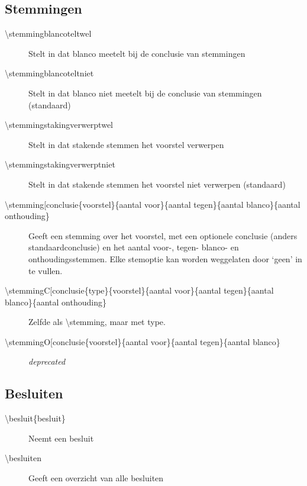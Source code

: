 \documentclass[a4paper]{notulen}
\begin{document}
		\subsection{Stemmingen}
		\begin{description}
			\item[\textbackslash stemmingblancoteltwel] Stelt in dat blanco meetelt bij de conclusie van stemmingen
			\item[\textbackslash stemmingblancoteltniet] Stelt in dat blanco niet meetelt bij de conclusie van stemmingen (standaard)
			\item[\textbackslash stemmingstakingverwerptwel] Stelt in dat stakende stemmen het voorstel verwerpen
			\item[\textbackslash stemmingstakingverwerptniet] Stelt in dat stakende stemmen het voorstel niet verwerpen (standaard)
			
			\item[\textbackslash stemming[conclusie\rbrack\{voorstel\}\{aantal voor\}\{aantal tegen\}\{aantal blanco\}\{aantal onthouding\}] Geeft een stemming over het voorstel, met een optionele conclusie (anders standaardconclusie) en het aantal voor-, tegen- blanco- en onthoudingsstemmen. Elke stemoptie kan worden weggelaten door `geen' in te vullen.
			\item[\textbackslash stemmingC[conclusie\rbrack\{type\}\{voorstel\}\{aantal voor\}\{aantal tegen\}\{aantal blanco\}\{aantal onthouding\}] Zelfde als \textbackslash stemming, maar met type.
			\item[\textbackslash stemmingO[conclusie\rbrack\{voorstel\}\{aantal voor\}\{aantal tegen\}\{aantal blanco\}] \emph{deprecated}

		\end{description}
		\subsection{Besluiten}
		\begin{description}
			\item[\textbackslash besluit\{besluit\}] Neemt een besluit
			\item[\textbackslash besluiten] Geeft een overzicht van alle besluiten
		\end{description}
\end{document}
